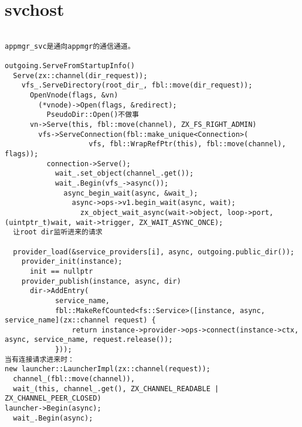 \section{svchost}

\begin{verbatim}

appmgr_svc是通向appmgr的通信通道。

outgoing.ServeFromStartupInfo()
  Serve(zx::channel(dir_request));
    vfs_.ServeDirectory(root_dir_, fbl::move(dir_request));
      OpenVnode(flags, &vn)
        (*vnode)->Open(flags, &redirect);
          PseudoDir::Open()不做事
      vn->Serve(this, fbl::move(channel), ZX_FS_RIGHT_ADMIN)
        vfs->ServeConnection(fbl::make_unique<Connection>(
                    vfs, fbl::WrapRefPtr(this), fbl::move(channel), flags));
          connection->Serve();
            wait_.set_object(channel_.get());
            wait_.Begin(vfs_->async());
              async_begin_wait(async, &wait_);
                async->ops->v1.begin_wait(async, wait);
                  zx_object_wait_async(wait->object, loop->port, (uintptr_t)wait, wait->trigger, ZX_WAIT_ASYNC_ONCE);
  让root dir监听进来的请求

  provider_load(&service_providers[i], async, outgoing.public_dir());
    provider_init(instance);
      init == nullptr
    provider_publish(instance, async, dir)
      dir->AddEntry(
            service_name,
            fbl::MakeRefCounted<fs::Service>([instance, async, service_name](zx::channel request) {
                return instance->provider->ops->connect(instance->ctx, async, service_name, request.release());
            }));
当有连接请求进来时：
new launcher::LauncherImpl(zx::channel(request));
  channel_(fbl::move(channel)),
  wait_(this, channel_.get(), ZX_CHANNEL_READABLE | ZX_CHANNEL_PEER_CLOSED) 
launcher->Begin(async);
  wait_.Begin(async);
\end{verbatim}